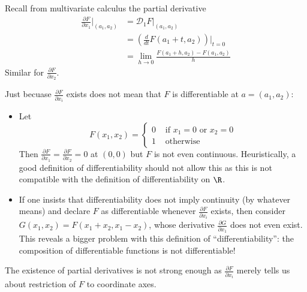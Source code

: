 \documentclass[a4paper]{article}
\newcommand*{\D}{\mathcal{D}}
\theoremstyle{definition}
\begin{document}
Recall from multivariate calculus the partial derivative
\begin{align*}
  \frac{\partial F}{\partial x_1} \Big|_{(a_1, a_2)} &= \D_1 F|_{(a_1, a_2)} \\
                                                     &= \left( \frac{d}{dt} F(a_1 + t, a_2) \right) \big|_{t = 0} \\
                                                     &= \lim_{h \to 0} \frac{F(a_1 + h, a_2) - F(a_1, a_2)}{h}
\end{align*}
Similar for \(\frac{\partial F}{\partial x_2}\).

\begin{note}
  Just becuase \(\frac{\partial F}{\partial x_i}\) exists does not mean that \(F\) is differentiable at \(a = (a_1, a_2)\):

  \begin{eg}\leavevmode
    \begin{itemize}
    \item Let
      \[
        F(x_1, x_2) =
        \begin{cases}
          0 & \text{ if } x_1 = 0 \text{ or } x_2 = 0 \\
          1 & \text{ otherwise}
        \end{cases}
      \]
      Then \(\frac{\partial F}{\partial x_1} = \frac{\partial F}{\partial x_2} = 0\) at \((0, 0)\) but \(F\) is not even continuous. Heuristically, a good definition of differentiability should not allow this as this is not compatible with the definition of differentiability on \(\R\).
    \item If one insists that differentiability does not imply continuity (by whatever means) and declare \(F\) as differentiable whenever \(\frac{\partial F}{\partial x_i}\) exists, then consider \(G(x_1, x_2) = F(x_1 + x_2, x_1 - x_2)\), whose derivative \(\frac{\partial G}{\partial x_1}\) does not even exist. This reveals a bigger problem with this definition of ``differentiability'': the composition of differentiable functions is not differentiable!
    \end{itemize}
  \end{eg}
\end{note}

The existence of partial derivatives is not strong enough as \(\frac{\partial F}{\partial x_i}\) merely tells us about restriction of \(F\) to coordinate axes.
\end{document}
